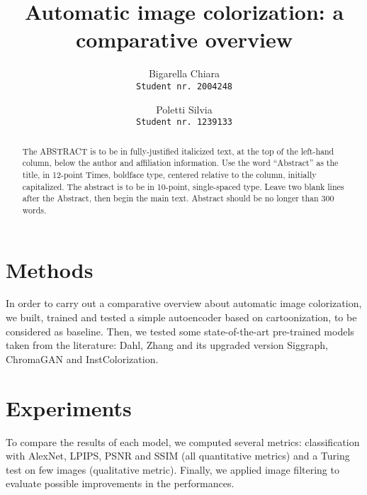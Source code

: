 \documentclass[10pt,twocolumn,letterpaper]{article}
\begin{document}
\title{Automatic image colorization: a comparative overview}
\author{Bigarella Chiara\\
{\tt\small Student nr. 2004248}
\and
Poletti Silvia\\
{\tt\small Student nr. 1239133}
}

\maketitle

\begin{abstract}
   The ABSTRACT is to be in fully-justified italicized text, at the top
   of the left-hand column, below the author and affiliation
   information. Use the word ``Abstract'' as the title, in 12-point
   Times, boldface type, centered relative to the column, initially
   capitalized. The abstract is to be in 10-point, single-spaced type.
   Leave two blank lines after the Abstract, then begin the main text.
   Abstract should be no longer than 300 words.
\end{abstract}





\section{Methods}
In order to carry out a comparative overview about automatic image colorization, we built, trained and tested a simple autoencoder based on cartoonization, to be considered as baseline. Then, we tested some state-of-the-art pre-trained models taken from the literature: Dahl, Zhang and its upgraded version Siggraph, ChromaGAN and InstColorization.







\section{Experiments}
To compare the results of each model, we computed several metrics: classification with AlexNet, LPIPS, PSNR and SSIM (all quantitative metrics) and a Turing test on few images (qualitative metric). Finally, we applied image filtering to evaluate possible improvements in the performances.








{\small


}
\end{document}
